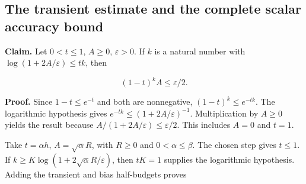 \documentclass[11pt,a4paper]{report}
\begin{document}
\subsection{\texorpdfstring{The transient estimate and the complete scalar accuracy bound}{The transient estimate and the complete scalar accuracy bound}}
\label{report-step-WassersteinMixing-Complexity-lean-3}


\textbf{Claim.} Let \(0<t\le1\), \(A\ge0\), \(\varepsilon>0\). If \(k\) is a natural number with \(\log(1+2A/\varepsilon)\le tk\), then

\[(1-t)^kA\le\varepsilon/2.\]


\textbf{Proof.} Since \(1-t\le e^{-t}\) and both are nonnegative, \((1-t)^k\le e^{-tk}\). The logarithmic hypothesis gives \(e^{-tk}\le(1+2A/\varepsilon)^{-1}\). Multiplication by \(A\ge0\) yields the result because \(A/(1+2A/\varepsilon)\le\varepsilon/2\). This includes \(A=0\) and \(t=1\).




Take \(t=\alpha h\), \(A=\sqrt\alpha R\), with \(R\ge0\) and \(0<\alpha\le\beta\). The chosen step gives \(t\le1\). If \(k\ge K\log(1+2\sqrt\alpha R/\varepsilon)\), then \(tK=1\) supplies the logarithmic hypothesis. Adding the transient and bias half-budgets proves
\end{document}
